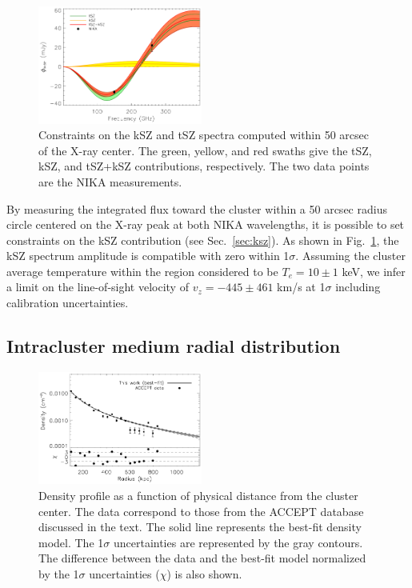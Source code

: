 \documentclass[twocolumn,traditabstract]{aa}
\begin{document}
	\begin{figure}[h]
	\centering
	\includegraphics[width=0.48\textwidth]{Figure/ksz_constraint.pdf}
	\caption{Constraints on the kSZ and tSZ spectra computed within 50 arcsec of the \mbox{X-ray} center. The green, yellow, and red swaths give the tSZ, kSZ, and tSZ+kSZ contributions, respectively. The two data points are the NIKA measurements.}
        \label{fig:ksz_spec}
	\end{figure}
By measuring the integrated flux toward the cluster within a 50 arcsec radius circle centered on the \mbox{X-ray} peak at both NIKA wavelengths, it is possible to set constraints on the kSZ contribution (see Sec.~\ref{sec:ksz}). As shown in Fig.~\ref{fig:ksz_spec}, the kSZ spectrum amplitude is compatible with zero within 1$\sigma$. Assuming the cluster average temperature within the region considered to be $T_e = 10 \pm 1$ keV, we infer a limit on the line-of-sight velocity of $v_z = -445 \pm 461$ km/s at 1$\sigma$ including calibration uncertainties.

\subsection{Intracluster medium radial distribution}\label{sec:icm_3d_result}
	\begin{figure}[h]
	\centering
	\includegraphics[width=0.48\textwidth]{Figure/density_profile.pdf}
	\caption{Density profile as a function of physical distance from the cluster center. The data correspond to those from the ACCEPT database \citep{cavagnolo2009} discussed in the text. The solid line represents the best-fit density model. The 1$\sigma$ uncertainties are represented by the gray contours. The difference between the data and the best-fit model normalized by the 1$\sigma$ uncertainties ($\chi$) is also shown.}
        \label{fig:density_profile}
	\end{figure}
	
\end{document}
